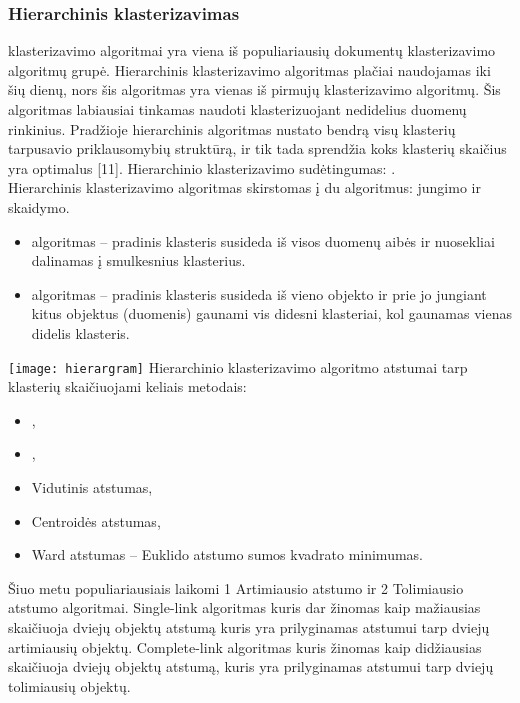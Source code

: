 \documentclass{VUMIFInfKursinis}
\begin{document}
		\subsubsection{Hierarchinis klasterizavimas}
			 klasterizavimo algoritmai yra viena iš populiariausių dokumentų klasterizavimo algoritmų grupė. Hierarchinis klasterizavimo algoritmas plačiai naudojamas iki šių dienų, nors šis algoritmas yra vienas iš pirmujų klasterizavimo algoritmų. Šis algoritmas labiausiai tinkamas naudoti klasterizuojant nedidelius duomenų rinkinius. Pradžioje hierarchinis algoritmas nustato bendrą visų klasterių tarpusavio priklausomybių struktūrą, ir tik tada sprendžia koks klasterių skaičius yra optimalus [11]. Hierarchinio klasterizavimo sudėtingumas: .\\
			Hierarchinis klasterizavimo algoritmas skirstomas į du algoritmus: jungimo ir skaidymo.
			\begin{itemize}
				\item {} algoritmas – pradinis klasteris susideda iš visos duomenų aibės ir nuosekliai dalinamas į smulkesnius klasterius.
				\item {} algoritmas – pradinis klasteris susideda iš vieno objekto ir prie jo jungiant kitus objektus (duomenis) gaunami vis didesni klasteriai, kol gaunamas vienas didelis klasteris.
			\end{itemize}
			\texttt{[image: hierargram]}
			Hierarchinio klasterizavimo algoritmo atstumai tarp klasterių skaičiuojami keliais metodais:
			\begin{itemize}
				\item {},
				\item {},
				\item Vidutinis atstumas,
				\item Centroidės atstumas,
				\item Ward atstumas – Euklido atstumo sumos kvadrato minimumas.
			\end{itemize}
			Šiuo metu populiariausiais laikomi 1 Artimiausio atstumo ir 2 Tolimiausio atstumo algoritmai.  Single-link algoritmas kuris dar žinomas kaip mažiausias skaičiuoja dviejų objektų atstumą kuris yra prilyginamas atstumui tarp dviejų artimiausių objektų. Complete-link algoritmas kuris žinomas kaip didžiausias skaičiuoja dviejų objektų atstumą, kuris yra prilyginamas atstumui tarp dviejų tolimiausių objektų.
\end{document}
